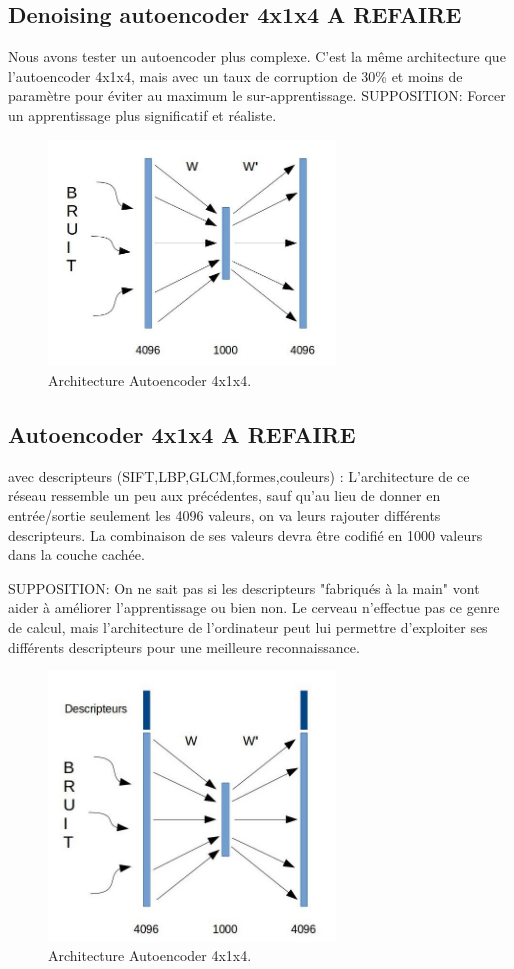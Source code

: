 \subsection{Denoising autoencoder 4x1x4 A REFAIRE} Nous avons tester un autoencoder plus complexe. C'est la même architecture que l'autoencoder 4x1x4, mais avec un taux de corruption de 30\% et moins de paramètre pour éviter au maximum le sur-apprentissage.
SUPPOSITION: Forcer un apprentissage plus significatif et réaliste.

\begin{figure}[H]
	\centering
		\includegraphics[width=3in]{Figures/ae/denoising.jpg}
	\caption[An Electron]{Architecture Autoencoder 4x1x4.}
	\label{fig:Electron}
\end{figure}

\subsection{Autoencoder 4x1x4 A REFAIRE} avec descripteurs (SIFT,LBP,GLCM,formes,couleurs) : L'architecture de ce réseau ressemble un peu aux précédentes, sauf qu'au lieu de donner en entrée/sortie seulement les 4096 valeurs, on va leurs rajouter différents descripteurs. La combinaison de ses valeurs devra être codifié en 1000 valeurs dans la couche cachée.
 
SUPPOSITION: On ne sait pas si les descripteurs "fabriqués à la main" vont aider à améliorer l'apprentissage ou bien non. Le cerveau n'effectue pas ce genre de calcul, mais l'architecture de l'ordinateur peut lui permettre d'exploiter ses différents descripteurs pour une meilleure reconnaissance.


\begin{figure}[H]
	\centering
		\includegraphics[width=3in]{Figures/ae/AE-Descripteur.jpg}
	\caption[An Electron]{Architecture Autoencoder 4x1x4.}
	\label{fig:Electron}
\end{figure}



